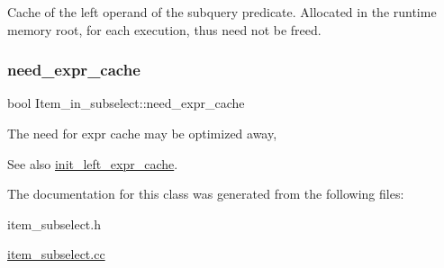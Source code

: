 Cache of the left operand of the subquery predicate. Allocated in the runtime memory root, for each execution, thus need not be freed. \mbox{\label{classItem__in__subselect_a33b13f3f53fb842de54a042f0e467976}} 
\subsubsection{\texorpdfstring{need\+\_\+expr\+\_\+cache}{need\_expr\_cache}}
{\footnotesize\ttfamily bool Item\+\_\+in\+\_\+subselect\+::need\+\_\+expr\+\_\+cache\hspace{0.3cm}{\ttfamily [protected]}}

The need for expr cache may be optimized away, \begin{DoxySeeAlso}{See also}
\mbox{\hyperlink{classItem__in__subselect_a20740a2186be83e3357e1b2f9c707a54}{init\+\_\+left\+\_\+expr\+\_\+cache}}. 
\end{DoxySeeAlso}


The documentation for this class was generated from the following files\+:\begin{DoxyCompactItemize}
\item 
item\+\_\+subselect.\+h\item 
\mbox{\hyperlink{item__subselect_8cc}{item\+\_\+subselect.\+cc}}\end{DoxyCompactItemize}
